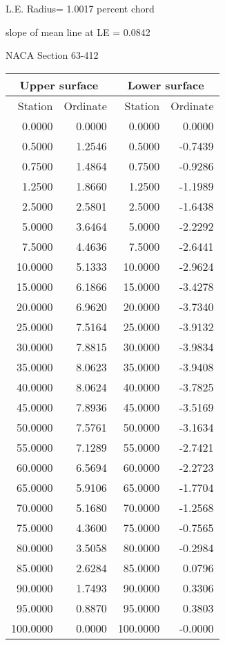 \documentclass[11pt]{book}
\begin{document}
L.E. Radius=  1.0017 percent chord


 slope of mean line at LE =  0.0842
 \newpage
  \label{s63-412}
 \begin{Large}
 NACA Section 63-412
 \end{Large}
  
 \vspace{8mm}
 \begin{tabular}{|r|r|r|r|} \hline 
 \multicolumn{2}{|c|}{Upper surface} & \multicolumn{2}{|c|}{Lower surface} \\
 \hline
 Station & Ordinate & Station & Ordinate \\
 \hline
0.0000 & 0.0000 & 0.0000 & 0.0000 \\
0.5000 & 1.2546 & 0.5000 & -0.7439 \\
0.7500 & 1.4864 & 0.7500 & -0.9286 \\
1.2500 & 1.8660 & 1.2500 & -1.1989 \\
2.5000 & 2.5801 & 2.5000 & -1.6438 \\
5.0000 & 3.6464 & 5.0000 & -2.2292 \\
7.5000 & 4.4636 & 7.5000 & -2.6441 \\
10.0000 & 5.1333 & 10.0000 & -2.9624 \\
15.0000 & 6.1866 & 15.0000 & -3.4278 \\
20.0000 & 6.9620 & 20.0000 & -3.7340 \\
25.0000 & 7.5164 & 25.0000 & -3.9132 \\
30.0000 & 7.8815 & 30.0000 & -3.9834 \\
35.0000 & 8.0623 & 35.0000 & -3.9408 \\
40.0000 & 8.0624 & 40.0000 & -3.7825 \\
45.0000 & 7.8936 & 45.0000 & -3.5169 \\
50.0000 & 7.5761 & 50.0000 & -3.1634 \\
55.0000 & 7.1289 & 55.0000 & -2.7421 \\
60.0000 & 6.5694 & 60.0000 & -2.2723 \\
65.0000 & 5.9106 & 65.0000 & -1.7704 \\
70.0000 & 5.1680 & 70.0000 & -1.2568 \\
75.0000 & 4.3600 & 75.0000 & -0.7565 \\
80.0000 & 3.5058 & 80.0000 & -0.2984 \\
85.0000 & 2.6284 & 85.0000 & 0.0796 \\
90.0000 & 1.7493 & 90.0000 & 0.3306 \\
95.0000 & 0.8870 & 95.0000 & 0.3803 \\
100.0000 & 0.0000 & 100.0000 & -0.0000 \\
 \hline 
 \end{tabular}
\end{document}
